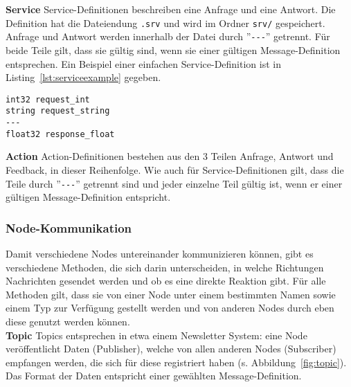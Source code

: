 \textbf{Service} Service-Definitionen beschreiben eine Anfrage und eine Antwort.
Die Definition hat die Dateiendung \verb|.srv| und wird im Ordner \verb|srv/| gespeichert.
Anfrage und Antwort werden innerhalb der Datei durch ''\verb|---|'' getrennt.
Für beide Teile gilt, dass sie gültig sind, wenn sie einer gültigen Message-Definition entsprechen.
Ein Beispiel einer einfachen Service-Definition ist in Listing~\ref{lst:serviceexample} gegeben.\\
\begin{minipage}{\linewidth}%
\begin{lstlisting}[caption={Beispiel einer Service-Definition}, label={lst:serviceexample}]
int32 request_int
string request_string
---
float32 response_float
\end{lstlisting}
\end{minipage}

\textbf{Action} Action-Definitionen bestehen aus den 3 Teilen Anfrage, Antwort und Feedback, in dieser Reihenfolge.
Wie auch für Service-Definitionen gilt, dass die Teile durch ''\verb|---|'' getrennt sind und jeder einzelne Teil gültig ist, wenn er einer gültigen Message-Definition entspricht.

\subsubsection{Node-Kommunikation}{\label{rosnodecomm}}
Damit verschiedene Nodes untereinander kommunizieren können, gibt es verschiedene Methoden, die sich darin unterscheiden, in welche Richtungen Nachrichten gesendet werden und ob es eine direkte Reaktion gibt.
Für alle Methoden gilt, dass sie von einer Node unter einem bestimmten Namen sowie einem Typ zur Verfügung gestellt werden und von anderen Nodes durch eben diese genutzt werden können.\\

\textbf{Topic} Topics entsprechen in etwa einem Newsletter System: eine Node veröffentlicht Daten (Publisher), welche von allen anderen Nodes (Subscriber) empfangen werden, die sich für diese registriert haben (s. Abbildung~\ref{fig:topic}).
Das Format der Daten entspricht einer gewählten Message-Definition.\\

